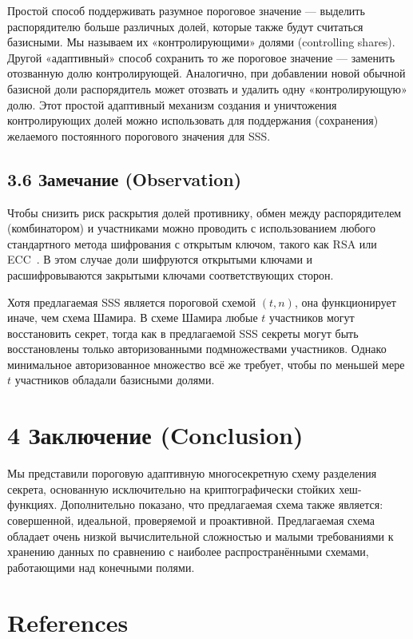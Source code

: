 Простой способ поддерживать разумное пороговое значение — выделить распорядителю больше различных долей, которые также будут считаться базисными. Мы называем их «контролирующими» долями (controlling shares). Другой «адаптивный» способ сохранить то же пороговое значение — заменить отозванную долю контролирующей. Аналогично, при добавлении новой обычной базисной доли распорядитель может отозвать и удалить одну «контролирующую» долю. Этот простой адаптивный механизм создания и уничтожения контролирующих долей можно использовать для поддержания (сохранения) желаемого постоянного порогового значения для SSS.

\subsection*{3.6 \quad Замечание (Observation)}

Чтобы снизить риск раскрытия долей противнику, обмен между распорядителем (комбинатором) и участниками можно проводить с использованием любого стандартного метода шифрования с открытым ключом, такого как RSA или ECC~\cite{1,2}. В этом случае доли шифруются открытыми ключами и расшифровываются закрытыми ключами соответствующих сторон.

Хотя предлагаемая SSS является пороговой схемой \((t,n)\), она функционирует иначе, чем схема Шамира. В схеме Шамира любые \(t\) участников могут восстановить секрет, тогда как в предлагаемой SSS секреты могут быть восстановлены только авторизованными подмножествами участников. Однако минимальное авторизованное множество всё же требует, чтобы по меньшей мере \(t\) участников обладали базисными долями.

\section*{4 \quad Заключение (Conclusion)}

Мы представили пороговую адаптивную многосекретную схему разделения секрета, основанную исключительно на криптографически стойких хеш-функциях. Дополнительно показано, что предлагаемая схема также является: совершенной, идеальной, проверяемой и проактивной. Предлагаемая схема обладает очень низкой вычислительной сложностью и малыми требованиями к хранению данных по сравнению с наиболее распространёнными схемами, работающими над конечными полями.

\section*{References}

